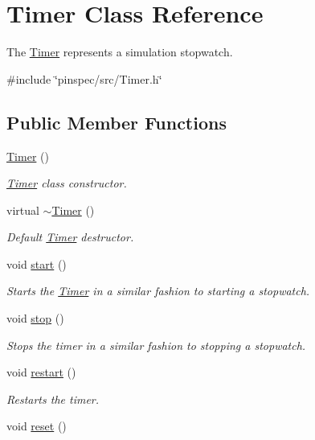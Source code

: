 \hypertarget{classTimer}{\section{Timer Class Reference}
\label{classTimer}
}


The \hyperlink{classTimer}{Timer} represents a simulation stopwatch.  




{\ttfamily \#include \char`\"{}pinspec/src/\-Timer.\-h\char`\"{}}

\subsection*{Public Member Functions}
\begin{DoxyCompactItemize}
\item 
\hyperlink{classTimer_a5f16e8da27d2a5a5242dead46de05d97}{Timer} ()
\begin{DoxyCompactList}\small\item\em \hyperlink{classTimer}{Timer} class constructor. \end{DoxyCompactList}\item 
\hypertarget{classTimer_a14fa469c4c295c5fa6e66a4ad1092146}{virtual \hyperlink{classTimer_a14fa469c4c295c5fa6e66a4ad1092146}{$\sim$\-Timer} ()}\label{classTimer_a14fa469c4c295c5fa6e66a4ad1092146}

\begin{DoxyCompactList}\small\item\em Default \hyperlink{classTimer}{Timer} destructor. \end{DoxyCompactList}\item 
\hypertarget{classTimer_a3a8b5272198d029779dc9302a54305a8}{void \hyperlink{classTimer_a3a8b5272198d029779dc9302a54305a8}{start} ()}\label{classTimer_a3a8b5272198d029779dc9302a54305a8}

\begin{DoxyCompactList}\small\item\em Starts the \hyperlink{classTimer}{Timer} in a similar fashion to starting a stopwatch. \end{DoxyCompactList}\item 
\hypertarget{classTimer_a63f0eb44b27402196590a03781515dba}{void \hyperlink{classTimer_a63f0eb44b27402196590a03781515dba}{stop} ()}\label{classTimer_a63f0eb44b27402196590a03781515dba}

\begin{DoxyCompactList}\small\item\em Stops the timer in a similar fashion to stopping a stopwatch. \end{DoxyCompactList}\item 
void \hyperlink{classTimer_aa3f7871196bb56202af2bc982bfbfff6}{restart} ()
\begin{DoxyCompactList}\small\item\em Restarts the timer. \end{DoxyCompactList}\item 
\hypertarget{classTimer_a9020542d73357a4eef512eefaf57524b}{void \hyperlink{classTimer_a9020542d73357a4eef512eefaf57524b}{reset} ()}\label{classTimer_a9020542d73357a4eef512eefaf57524b}


\end{DoxyCompactItemize}
